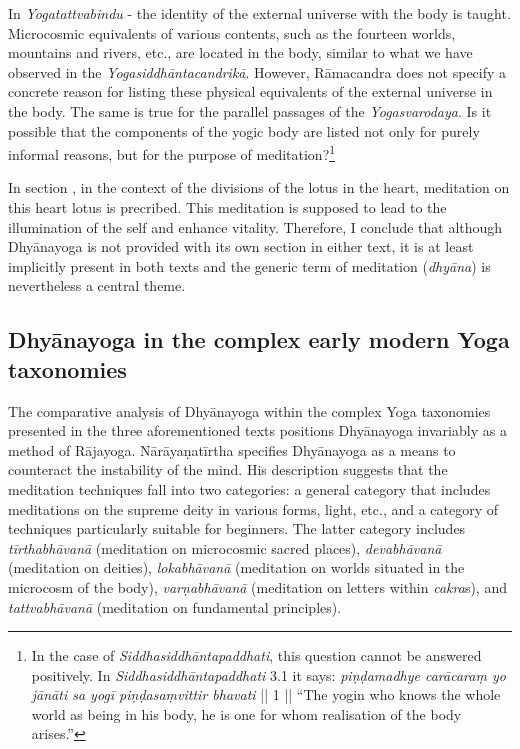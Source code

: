 In \textit{Yogatattvabindu} - the identity of the external universe with the body is taught. Microcosmic equivalents of various contents, such as the fourteen worlds, mountains and rivers, etc., are located in the body, similar to what we have observed in the \textit{Yogasiddhāntacandrikā}. However, Rāmacandra does not specify a concrete reason for listing these physical equivalents of the external universe in the body. The same is true for the parallel passages of the \textit{Yogasvarodaya}. Is it possible that the components of the yogic body are listed not only for purely informal reasons, but for the purpose of meditation?\footnote{In the case of \textit{Siddhasiddhāntapaddhati}, this question cannot be answered positively. In \textit{Siddhasiddhāntapaddhati} 3.1 it says: \textit{piṇḍamadhye carācaraṃ yo jānāti sa yogī piṇḍasaṃvittir bhavati} || 1 || ``The yogin who knows the whole world as being in his body, he is one for whom realisation of the body arises.''} 

In section , in the context of the divisions of the lotus in the heart, meditation on this heart lotus is precribed. This meditation is supposed to lead to the illumination of the self and enhance vitality. Therefore, I conclude that although Dhyānayoga is not provided with its own section in either text, it is at least implicitly present in both texts and the generic term of meditation (\textit{dhyāna}) is nevertheless a central theme. 

\subsection{Dhyānayoga in the complex early modern Yoga taxonomies}

The comparative analysis of Dhyānayoga within the complex Yoga taxonomies presented in the three aforementioned texts positions Dhyānayoga invariably as a method of Rājayoga. Nārāyaṇatīrtha specifies Dhyānayoga as a means to counteract the instability of the mind. His description suggests that the meditation techniques fall into two categories: a general category that includes meditations on the supreme deity in various forms, light, etc., and a category of techniques particularly suitable for beginners. The latter category includes \textit{tīrthabhāvanā} (meditation on microcosmic sacred places), \textit{devabhāvanā} (meditation on deities), \textit{lokabhāvanā} (meditation on worlds situated in the microcosm of the body), \textit{varṇabhāvanā} (meditation on letters within \textit{cakra}s), and \textit{tattvabhāvanā} (meditation on fundamental principles).

